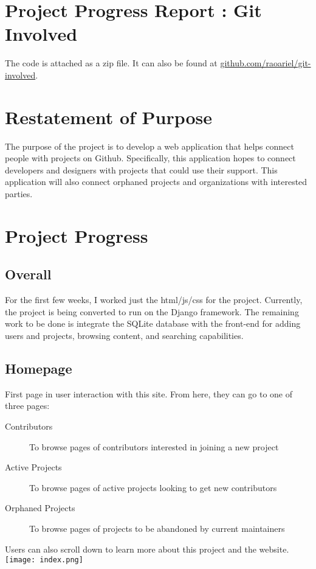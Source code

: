 \documentclass[11pt]{article}
\begin{document}
\section{Project Progress Report : Git Involved}
The code is attached as a zip file. It can also be found at \href{http://github.com/raoariel/git-involved}{github.com/raoariel/git-involved}.

\section{Restatement of Purpose}
The purpose of the project is to develop a web application that helps connect people with projects on Github. Specifically, this application hopes to connect developers and designers with projects that could use their support. This application will also connect orphaned projects and organizations with interested parties.

\section{Project Progress}
\subsection{Overall}
For the first few weeks, I worked just the html/js/css for the project. Currently, the project is being converted to run on the Django framework. The remaining work to be done is integrate the SQLite database with the front-end for adding users and projects, browsing content, and searching capabilities.

\subsection{Homepage}
\begin{multicols}{2}
First page in user interaction with this site. From here, they can go to one of three pages: 
\begin{description}
\item[Contributors] To browse pages of contributors interested in joining a new project
\item[Active Projects] To browse pages of active projects looking to get new contributors
\item[Orphaned Projects] To browse pages of projects to be abandoned by current maintainers
\end{description}
Users can also scroll down to learn more about this project and the website.
\columnbreak
\vspace*{10pt}
\texttt{[image: index.png]}
\vspace*{30pt}
\end{multicols}
\end{document}
